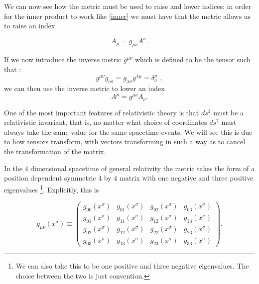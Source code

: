 We can now see how the metric must be used to raise and lower indices: in order for the inner product to work like \eqref{inner} we must have that the metric allows us to raise an index

\begin{equation} \label{raise}
	A_{\mu} = g_{\mu \nu} A^{\nu} .
\end{equation}

If we now introduce the inverse metric \(g^{\mu \nu}\) which is defined to be the tensor such that \cite{carroll}:
\begin{equation} \label{inverse-metric}
	g^{\mu \nu} g_{\nu \sigma} = g_{\lambda \sigma} g^{\lambda \mu} = \delta^{\mu}_{\sigma} \,\, ,
\end{equation}
\noindent we can then use the inverse metric to lower an index
\begin{equation} \label{lower}
	A^{\mu} = g^{\mu \nu} A_{\nu} .
\end{equation}

One of the most important features of relativistic theory is that \(ds^2\) must be a relativistic invariant, that is, no matter what choice of coordinates \(ds^2\) must always take the same value for the same spacetime events. We will see this is due to how tensors transform, with vectors transforming in such a way as to cancel the transformation of the matrix.

In the 4 dimensional spacetime of general relativity the metric takes the form of a position dependent symmetric 4 by 4 matrix with one negative and three positive eigenvalues 
\footnote{We can also take this to be one positive and three negative eigenvalues. The choice between the two is just convention.}. 
Explicitly, this is

\begin{equation} \label{metric-matrix}
	g_{\mu \nu} (x^{\sigma}) \equiv
	\begin{pmatrix} 
	g_{00} (x^{\sigma}) & g_{01} (x^{\sigma}) & g_{02} (x^{\sigma}) & g_{03} (x^{\sigma}) \\
	g_{01} (x^{\sigma}) & g_{11} (x^{\sigma}) & g_{12} (x^{\sigma}) & g_{13} (x^{\sigma}) \\
	g_{02} (x^{\sigma}) & g_{12} (x^{\sigma}) & g_{22} (x^{\sigma}) & g_{23} (x^{\sigma}) \\
	g_{03} (x^{\sigma}) & g_{13} (x^{\sigma}) & g_{23} (x^{\sigma}) & g_{33} (x^{\sigma}) 
\end{pmatrix} .
\end{equation}

